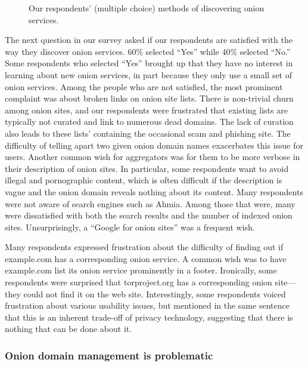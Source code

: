 \begin{figure}[t]
    \centering
    
    \caption{Our respondents' (multiple choice) methods of discovering onion
    services.}
    \label{fig:onion-discovery}
\end{figure}

The next question in our survey asked if our respondents are satisfied with the
way they discover onion services.  60\% selected ``Yes'' while 40\% selected
``No.'' Some respondents who selected ``Yes'' brought up that they have no
interest in learning about new onion services, in part because they only use a
small set of onion services.  Among the people who are not satisfied, the most
prominent complaint was about broken links on onion site lists.  There is
non-trivial churn among onion sites, and our respondents were frustrated that
existing lists are typically not curated and link to numerous dead domains.  The
lack of curation also leads to these lists' containing the occasional scam and
phishing site.  The difficulty of telling apart two given onion domain names
exacerbates this issue for users.  Another common wish for aggregators was for
them to be more verbose in their description of onion sites.  In particular,
some respondents want to avoid illegal and pornographic content, which is often
difficult if the description is vague and the onion domain reveals nothing about
its content.  Many respondents were not aware of search engines such as Ahmia.
Among those that were, many were dissatisfied with both the search results and
the number of indexed onion sites.  Unsurprisingly, a ``Google for onion sites''
was a frequent wish.

Many respondents expressed frustration about the difficulty of finding out if
example.com has a corresponding onion service.  A common wish was to have
example.com list its onion service prominently in a footer.  Ironically, some
respondents were surprised that torproject.org has a corresponding onion
site---they could not find it on the web site.  Interestingly, some respondents
voiced frustration about various usability issues, but mentioned in the same
sentence that this is an inherent trade-off of privacy technology, suggesting
that there is nothing that can be done about it.

\subsubsection{Onion domain management is problematic}

